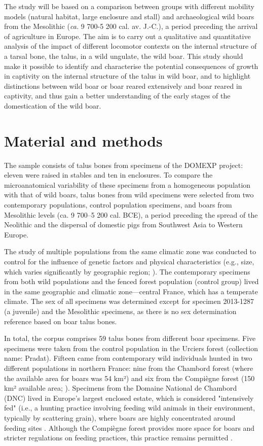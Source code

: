 \documentclass[12pt,a4paper]{article}
\begin{document}
The study will be based on a comparison between groups with different mobility models (natural habitat, large enclosure and stall) and archaeological wild boars from the Mesolithic (\textit{ca.} 9 700-5 200 cal. av. J.-C.), a period preceding the arrival of agriculture in Europe. The aim is to carry out a qualitative and quantitative analysis of the impact of different locomotor contexts on the internal structure of a tarsal bone, the talus, in a wild ungulate, the wild boar. This study should make it possible to identify and characterise the potential consequences of growth in captivity on the internal structure of the talus in wild boar, and to highlight distinctions between wild boar or boar reared extensively and boar reared in captivity, and thus gain a better understanding of the early stages of the domestication of the wild boar.

\section{Material and methods}
The sample consists of talus bones from specimens of the DOMEXP project: eleven were raised in stables and ten in enclosures. To compare the microanatomical variability of these specimens from a homogeneous population with that of wild boars, talus bones from wild specimens were selected from two contemporary populations, control population specimens, and boars from Mesolithic levels (ca. 9 700–5 200 cal. BCE), a period preceding the spread of the Neolithic and the dispersal of domestic pigs from Southwest Asia to Western Europe. 

The study of multiple populations from the same climatic zone was conducted to control for the influence of genetic factors and physical characteristics (e.g., size, which varies significantly by geographic region; \cite{albarellaSizeShapeEurasian2009a,grovesCurrentViewsTaxonomy2007d}). The contemporary specimens from both wild populations and the fenced forest population (control group) lived in the same geographic and climatic zone—central France, which has a temperate climate. The sex of all specimens was determined except for specimen 2013-1287 (a juvenile) and the Mesolithic specimens, as there is no sex determination reference based on boar talus bones. 

In total, the corpus comprises 59 talus bones from different boar specimens. Five specimens were taken from the control population in the Urciers forest (collection name: Pradat). Fifteen came from contemporary wild individuals hunted in two different populations in northern France: nine from the Chambord forest (where the available area for boars was 54 km²) and six from the Compiègne forest (150 km² available area; \cite{neauxConstraintsAssociatedCaptivity2021t}). Specimens from the Domaine National de Chambord (DNC) lived in Europe's largest enclosed estate, which is considered "intensively fed" (i.e., a hunting practice involving feeding wild animals in their environment, typically by scattering grain), where boars are highly concentrated around feeding sites \cite{jegouxCHASSEDYNAMIQUEPOPULATIONS2016}. Although the Compiègne forest provides more space for boars and stricter regulations on feeding practices, this practice remains permitted \cite{onfFicheLotForet2023}.
\end{document}
